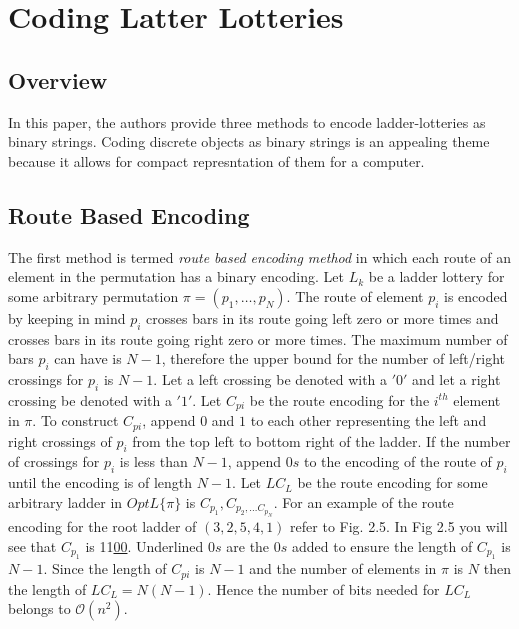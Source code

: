 \section{Coding Latter Lotteries}
\subsection{Overview}
In this paper, the authors provide three methods to encode ladder-lotteries as 
binary strings. Coding discrete objects as binary strings is an appealing theme because 
it allows for compact represntation of them for a computer.
\subsection{Route Based Encoding}
The first method is termed \emph{route based encoding method} in 
which each route of an element in the permutation has a binary encoding. Let $L_{k}$
be a ladder lottery for some arbitrary permutation $\pi=(p_{1},\dots,p_{N})$. The route 
of element $p_{i}$ is encoded by keeping in mind $p_{i}$ crosses bars in its route 
going left zero or more times and crosses bars in its route going right zero or 
more times. The maximum number of bars $p_{i}$ can have is $N-1$, therefore the 
upper bound for the number of left/right crossings for $p_{i}$ is $N-1$. 
Let a left crossing be denoted with a $'0'$ and let a right crossing be denoted 
with a $'1'$. Let $C_{pi}$ be the route encoding for the $i^{th}$ element 
in $\pi$. To construct $C_{pi}$,  append $0$ and $1$ to each other representing 
the left and right crossings of $p_{i}$ from the top left 
to bottom right of the ladder. If the number of crossings for $p_{i}$ 
is less than $N-1$, append $0s$ to the encoding of the route of $p_{i}$ until
the encoding is of length $N-1$. Let $LC_{L}$ be the route encoding for 
some arbitrary ladder in $OptL\{\pi\}$ is $C_{p_{1}}, C_{p_{2}, \dots C_{p_{N}}}$.
For an example of the route encoding for the root ladder of $(3,2,5,4,1)$ refer to 
Fig. 2.5. In Fig 2.5 you will see that $C_{p_{1}}$ is 11\underline{00}. Underlined 
$0s$ are the $0s$ added to ensure the length of $C_{p_{1}}$ is $N-1$.
Since the length of $C_{pi}$ is $N-1$ and the number of elements in $\pi$ is $N$
then the length of $LC_{L}=N(N-1)$. Hence the number of bits needed for $LC_{L}$ 
belongs to $\mathcal{O}(n^{2})$.\par 
